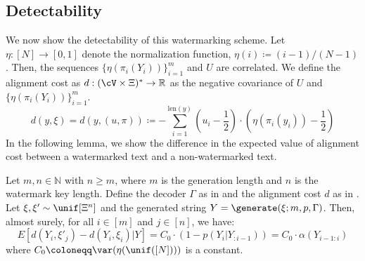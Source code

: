 \subsection{Detectability}
\label{sec:detectability}
We now show the detectability of this watermarking scheme. Let $\eta: [N] \rightarrow [0,1]$ denote the normalization function, \ie $\eta(i) \coloneqq (i-1)/(N-1)$. Then, the sequences $\{ \eta(\pi_i(Y_i)) \}_{i=1}^m$ and $U$ are correlated. We define the alignment cost as $d: (\cV \times \Xi )^* \rightarrow \mathbb{R}$ as the negative covariance of $U$ and $\{ \eta(\pi_i(Y_i)) \}_{i=1}^m$.
%
\begin{equation}
    d(y, \xi) = d(y, (u, \pi)) \coloneqq - \sum_{i=1}^{\mathrm{len}(y)} \left ( u_i - \frac{1}{2} \right) \cdot \left( \eta(\pi_i(y_i)) - \frac{1}{2} \right)
    \label{eq:alignment-cost}
\end{equation}
%
In the following lemma, we show the difference in the expected value of alignment cost between a watermarked text and a non-watermarked text.  
%
\begin{lemma}
    Let $m, n \in \mathbb{N}$ with $n \geq m$, where $m$ is the generation length and $n$ is the watermark key length. Define the decoder $\Gamma$ as in  and the alignment cost $d$ as in . Let $\xi, \xi' \sim \unif[\Xi^n]$ and the generated string $Y = \generate(\xi; m, p, \Gamma)$. Then, almost surely, for all $i \in [m]$ and $j \in [n]$, we have:
    \begin{equation*}
        E[d(Y_i, \xi'_j) - d(Y_i, \xi_i) | Y] = C_0 \cdot (1 - p(Y_i | Y_{:i-1})) = C_0 \cdot \alpha(Y_{i-1: i})
    \end{equation*}
    where $C_0 \coloneqq \var(\eta(\unif([N])))$ is a constant.
\end{lemma}
%